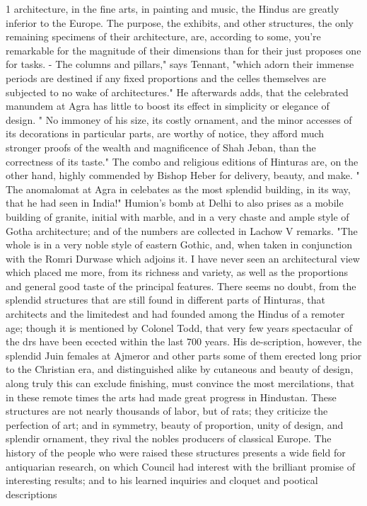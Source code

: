 1 architecture, in the fine arts, in painting and music, the Hindus are greatly inferior to the Europe. The purpose, the exhibits, and other structures, the only remaining specimens of their architecture, are, according to some, you’re remarkable for the magnitude of their dimensions than for their just proposes one for tasks. - The columns and pillars," says Tennant, "which adorn their immense periods are destined if any fixed proportions and the celles themselves are subjected to no wake of architectures." He afterwards adds, that the celebrated manundem at Agra has little to boost its effect in simplicity or elegance of design. " No immoney of his size, its costly ornament, and the minor accesses of its decorations in particular parts, are worthy of notice, they afford much stronger proofs of the wealth and magnificence of Shah Jeban, than the correctness of its taste." The combo and religious editions of Hinturas are, on the other hand, highly commended by Bishop Heber for delivery, beauty, and make. " The anomalomat at Agra in celebates as the most splendid building, in its way, that he had seen in India!" Humion's bomb at Delhi to also prises as a mobile building of granite, initial with marble, and in a very chaste and ample style of Gotha architecture; and of the numbers are collected in Lachow V remarks. "The whole is in a very noble style of eastern Gothic, and, when taken in conjunction with the Romri Durwase which adjoins it. I have never seen an architectural view which placed me more, from its richness and variety, as well as the proportions and general good taste of the principal features. There seems no doubt, from the splendid structures that are still found in different parts of Hinturas, that architects and the limitedest and had founded among the Hindus of a remoter age; though it is mentioned by Colonel Todd, that very few years spectacular of the drs have been ecected within the last 700 years. His de-scription, however, the splendid Juin females at Ajmeror and other parts some of them erected long prior to the Christian era, and distinguished alike by cutaneous and beauty of design, along truly this can exclude finishing, must convince the most mercilations, that in these remote times the arts had made great progress in Hindustan. These structures are not nearly thousands of labor, but of rats; they criticize the perfection of art; and in symmetry, beauty of proportion, unity of design, and splendir ornament, they rival the nobles producers of classical Europe. The history of the people who were raised these structures presents a wide field for antiquarian research, on which Council had interest with the brilliant promise of interesting results; and to his learned inquiries and cloquet and pootical descriptions\par\medskip
